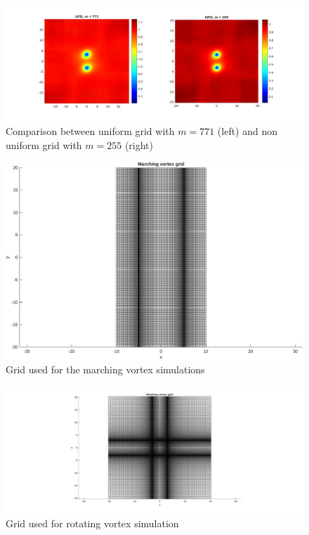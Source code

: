 \begin{figure}[H]
    \centering
    \includegraphics[width=\textwidth]{img/comp_unfd_771.pdf}
    \caption{Comparison between uniform grid with $m = 771$ (left) and non uniform grid with $m = 255$ (right)}
\end{figure}

\begin{figure}[H]
    \centering
    \includegraphics[width=\textwidth]{img/marching_grid.pdf}
    \caption{Grid used for the marching vortex simulations}
    \label{fig:mvortexgrid}
\end{figure}

\begin{figure}[H]
    \centering
    \includegraphics[width=\textwidth]{img/rotating_grid.pdf}
    \caption{Grid used for rotating vortex simulation}
    \label{fig:rvortexgrid}
\end{figure}

